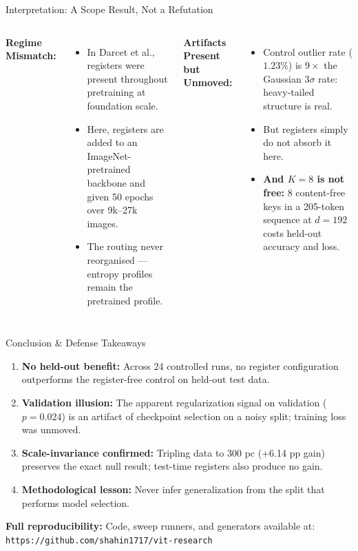 \documentclass[aspectratio=169]{beamer}
\begin{document}
\begin{frame}{Interpretation: A Scope Result, Not a Refutation}
\small
\begin{columns}[T]
\textbf{Regime Mismatch:}
\begin{itemize}\itemsep=2pt
\item In Darcet et al., registers were present throughout pretraining at foundation scale.
\item Here, registers are added to an ImageNet-pretrained backbone and given 50 epochs over 9k--27k images.
\item The routing never reorganised --- entropy profiles remain the pretrained profile.
\end{itemize}

\textbf{Artifacts Present but Unmoved:}
\begin{itemize}\itemsep=2pt
\item Control outlier rate ($1.23\%$) is $9\times$ the Gaussian $3\sigma$ rate: heavy-tailed structure is real.
\item But registers simply do not absorb it here.
\item \textbf{And $K=8$ is not free:} 8 content-free keys in a 205-token sequence at $d=192$ costs held-out accuracy and loss.
\end{itemize}
\end{columns}
\end{frame}

\begin{frame}{Conclusion \& Defense Takeaways}
\small
\begin{enumerate}\itemsep=3pt
\item \textbf{No held-out benefit:} Across 24 controlled runs, no register configuration outperforms the register-free control on held-out test data.
\item \textbf{Validation illusion:} The apparent regularization signal on validation ($p = 0.024$) is an artifact of checkpoint selection on a noisy split; training loss was unmoved.
\item \textbf{Scale-invariance confirmed:} Tripling data to 300 pc (+6.14 pp gain) preserves the exact null result; test-time registers also produce no gain.
\item \textbf{Methodological lesson:} Never infer generalization from the split that performs model selection.
\end{enumerate}

\smallskip
\begin{block}{}
\centering
\textbf{Full reproducibility:} Code, sweep runners, and generators available at:\\
\texttt{https://github.com/shahin1717/vit-research}
\end{block}
\end{frame}
\end{document}
